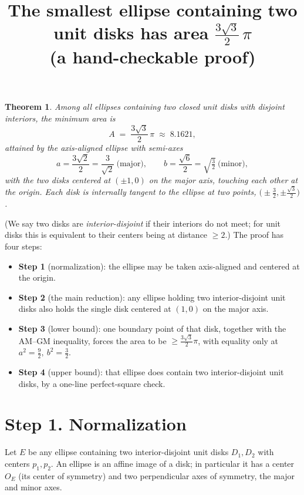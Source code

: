 \documentclass[11pt]{article}
\title{The smallest ellipse containing two unit disks has area
$\tfrac{3\sqrt3}{2}\,\pi$\\[2pt]
\large (a hand-checkable proof)}
\author{}
\date{}
\newtheorem{theorem}{Theorem}
\begin{document}
\maketitle

\begin{theorem}
Among all ellipses containing two closed unit disks with disjoint interiors, the minimum
area is
\[
A \;=\; \frac{3\sqrt3}{2}\,\pi \;\approx\; 8.1621,
\]
attained by the axis-aligned ellipse with semi-axes
\[
a=\frac{3\sqrt2}{2}=\frac{3}{\sqrt2}\ \text{(major)},\qquad
b=\frac{\sqrt6}{2}=\sqrt{\tfrac32}\ \text{(minor)},
\]
with the two disks centered at $(\pm1,0)$ on the major axis, touching each other at
the origin. Each disk is internally tangent to the ellipse at two points,
$\bigl(\pm\tfrac32,\pm\tfrac{\sqrt3}{2}\bigr)$.
\end{theorem}

\noindent (We say two disks are \emph{interior-disjoint} if their interiors do not meet; for unit
disks this is equivalent to their centers being at distance $\ge2$.) The proof has four steps:
\begin{itemize}[leftmargin=1.6em,itemsep=1pt]
  \item \textbf{Step 1} (normalization): the ellipse may be taken axis-aligned and centered at the
        origin.
  \item \textbf{Step 2} (the main reduction): any ellipse holding two interior-disjoint unit disks
        also holds the single disk centered at $(1,0)$ on the major axis.
  \item \textbf{Step 3} (lower bound): one boundary point of that disk, together with the AM--GM
        inequality, forces the area to be $\ge\tfrac{3\sqrt3}{2}\pi$, with equality only at
        $a^2=\tfrac92,\ b^2=\tfrac32$.
  \item \textbf{Step 4} (upper bound): that ellipse does contain two interior-disjoint unit disks,
        by a one-line perfect-square check.
\end{itemize}

\section*{Step 1. Normalization}

Let $E$ be any ellipse containing two interior-disjoint unit disks $D_1,D_2$ with centers
$p_1,p_2$. An ellipse is an affine image of a disk; in particular it has a center $O_E$
(its center of symmetry) and two perpendicular axes of symmetry, the major and minor axes.
\end{document}
